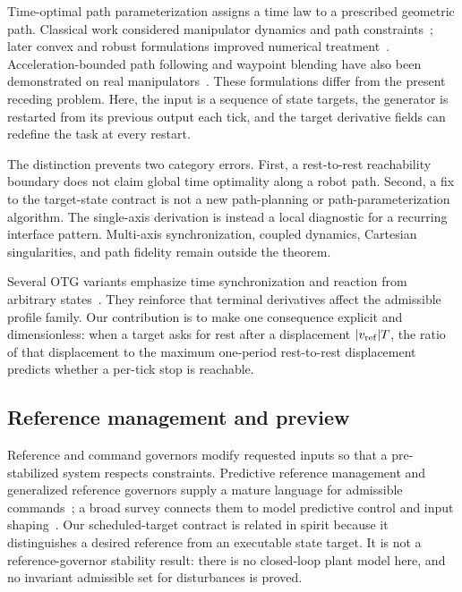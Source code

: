 Time-optimal path parameterization assigns a time law to a prescribed geometric path. Classical work considered manipulator dynamics and path constraints~\cite{bobrow1985time,shin1985minimum,shiller1989path}; later convex and robust formulations improved numerical treatment~\cite{verscheure2009time,pham2014topp}. Acceleration-bounded path following and waypoint blending have also been demonstrated on real manipulators~\cite{kunz2012time}. These formulations differ from the present receding problem. Here, the input is a sequence of state targets, the generator is restarted from its previous output each tick, and the target derivative fields can redefine the task at every restart.

The distinction prevents two category errors. First, a rest-to-rest reachability boundary does not claim global time optimality along a robot path. Second, a fix to the target-state contract is not a new path-planning or path-parameterization algorithm. The single-axis derivation is instead a local diagnostic for a recurring interface pattern. Multi-axis synchronization, coupled dynamics, Cartesian singularities, and path fidelity remain outside the theorem.

Several OTG variants emphasize time synchronization and reaction from arbitrary states~\cite{ahn2004aspot,beul2016multirotor,wang2020synchronous}. They reinforce that terminal derivatives affect the admissible profile family. Our contribution is to make one consequence explicit and dimensionless: when a target asks for rest after a displacement $\lvert v_{\mathrm{ref}}\rvert T$, the ratio of that displacement to the maximum one-period rest-to-rest displacement predicts whether a per-tick stop is reachable.

\subsection{Reference management and preview}

Reference and command governors modify requested inputs so that a pre-stabilized system respects constraints. Predictive reference management and generalized reference governors supply a mature language for admissible commands~\cite{bemporad1998reference,gilbert2002governor}; a broad survey connects them to model predictive control and input shaping~\cite{garone2017governors}. Our scheduled-target contract is related in spirit because it distinguishes a desired reference from an executable state target. It is not a reference-governor stability result: there is no closed-loop plant model here, and no invariant admissible set for disturbances is proved.

